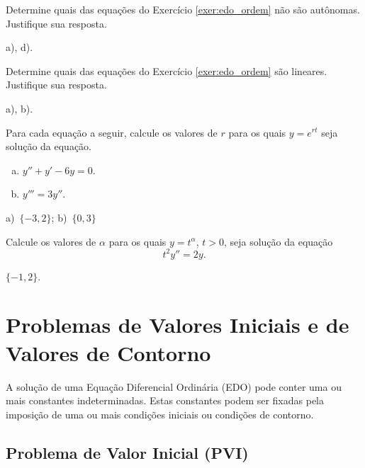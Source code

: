 \begin{exer}
  Determine quais das equações do Exercício \ref{exer:edo_ordem} não são autônomas. Justifique sua resposta.
\end{exer}
\begin{resp}
  a), d).
\end{resp}

\begin{exer}
  Determine quais das equações do Exercício \ref{exer:edo_ordem} são lineares. Justifique sua resposta.
\end{exer}
\begin{resp}
  a), b).
\end{resp}

\begin{exer}
  Para cada equação a seguir, calcule os valores de $r$ para os quais $y = e^{rt}$ seja solução da equação.
  \begin{enumerate}[a)]
  \item $y'' + y' - 6y = 0$.
  \item $y''' = 3y''$.
  \end{enumerate}
\end{exer}
\begin{resp}
  a)~$\{-3, 2\}$; b)~$\{0, 3\}$
\end{resp}

\begin{exer}
  Calcule os valores de $\alpha$ para os quais $y = t^\alpha$, $t>0$, seja solução da equação
  \begin{equation}
    t^2y'' = 2y.
  \end{equation}
\end{exer}
\begin{resp}
  $\{-1, 2\}$.
\end{resp}


\section{Problemas de Valores Iniciais e de Valores de Contorno}\label{cap_intro_sec_pv}

A solução de uma Equação Diferencial Ordinária (EDO) pode conter uma ou mais constantes indeterminadas. Estas constantes podem ser fixadas pela imposição de uma ou mais condições iniciais ou condições de contorno.

\subsection{Problema de Valor Inicial (PVI)}\label{cap_intro_sec_pv_ssec_pvi}

